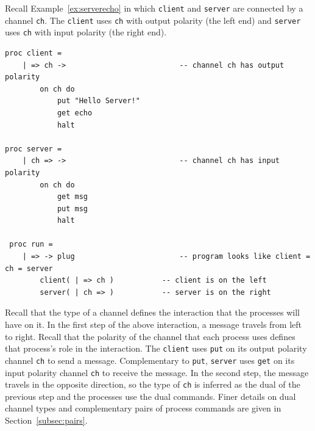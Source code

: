 \documentclass[acmsmall]{acmart}
\begin{document}
Recall Example~\ref{ex:serverecho} in which \lstinline$client$ and \lstinline$server$ are connected by a channel \lstinline$ch$. The \lstinline$client$ uses \lstinline$ch$ with output polarity (the left end) and \lstinline$server$ uses \lstinline$ch$ with input polarity (the right end).
\begin{lstlisting}[label=ex:serverechofull, caption=Server echos Client's message]
proc client = 
	| => ch ->							-- channel ch has output polarity
		on ch do 
			put "Hello Server!" 
			get echo				
			halt

proc server =  
	| ch => ->							-- channel ch has input polarity
		on ch do
			get msg						
			put msg						
			halt
			
 proc run = 
 	| => -> plug						-- program looks like client = ch = server
 		client( | => ch )			-- client is on the left
 		server( | ch => )			-- server is on the right
\end{lstlisting}
Recall that the type of a channel defines the interaction that the processes will have on it.
In the first step of the above interaction, a message travels from left to right.
Recall that the polarity of the channel that each process uses defines that process's role in the interaction.
The \lstinline$client$ uses \lstinline$put$ on its output polarity channel \lstinline$ch$ to send a message. Complementary to \lstinline$put$, \lstinline$server$ uses \lstinline$get$ on its input polarity channel \lstinline$ch$ to receive the message.
In the second step, the message travels in the opposite direction, so the type of \lstinline$ch$ is inferred as the dual of the previous step and the processes use the dual commands.
Finer details on dual channel types and complementary pairs of process commands are given in Section~\ref{subsec:pairs}.
\end{document}
